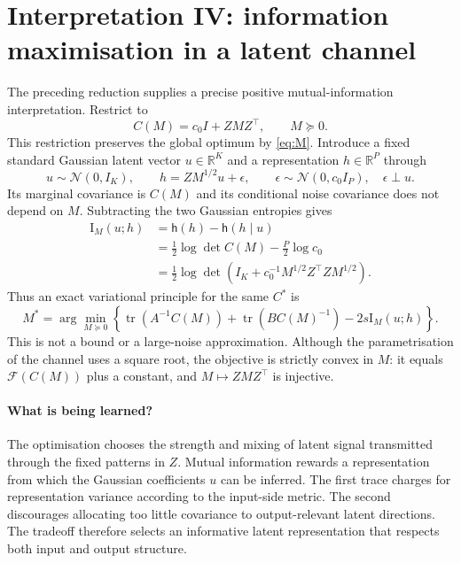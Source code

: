 \documentclass[11pt,a4paper]{article}
\newcommand{\tr}{\operatorname{tr}}
\newcommand{\R}{\mathbb R}
\newcommand{\Id}{\mathrm I}
\newcommand{\N}{\mathcal N}
\newcommand{\F}{\mathcal F}
\begin{document}
\section{Interpretation IV: information maximisation in a latent channel}\label{sec:MI}
The preceding reduction supplies a precise positive mutual-information
interpretation. Restrict to
\begin{equation}
 C(M)=c_0I+ZMZ^\top,\qquad M\succeq0.
\end{equation}
This restriction preserves the global optimum by \eqref{eq:M}.
Introduce a fixed standard Gaussian latent vector $u\in\R^K$ and a
representation $h\in\R^P$ through
\begin{equation}\label{eq:channel}
 u\sim\N(0,I_K),\qquad
 h=ZM^{1/2}u+\epsilon,\qquad
 \epsilon\sim\N(0,c_0I_P),\quad \epsilon\perp u.
\end{equation}
Its marginal covariance is $C(M)$ and its conditional noise covariance
does not depend on $M$. Subtracting the two Gaussian entropies gives
\begin{align}
 \Id_M(u;h)
 &=\mathsf h(h)-\mathsf h(h\mid u)\\
 &=\frac12\log\det C(M)-\frac P2\log c_0\\
 &=\frac12\log\det\left(I_K+c_0^{-1}M^{1/2}Z^\top ZM^{1/2}\right).
\end{align}
Thus an exact variational principle for the same $C^*$ is
\begin{equation}\label{eq:MIobjective}
 \boxed{M^*=\arg\min_{M\succeq0}\left\{
 \tr(A^{-1}C(M))+\tr(BC(M)^{-1})-2s\Id_M(u;h)\right\}.}
\end{equation}
This is not a bound or a large-noise approximation.
Although the parametrisation of the channel uses a square root, the objective
is strictly convex in $M$: it equals $\F(C(M))$ plus a constant, and
$M\mapsto ZMZ^\top$ is injective.

\paragraph{What is being learned?}
The optimisation chooses the strength and mixing of latent signal transmitted
through the fixed patterns in $Z$. Mutual information rewards a representation
from which the Gaussian coefficients $u$ can be inferred. The first trace
charges for representation variance according to the input-side metric.
The second discourages allocating too little covariance to output-relevant
latent directions. The tradeoff therefore selects an informative latent
representation that respects both input and output structure.
\end{document}

